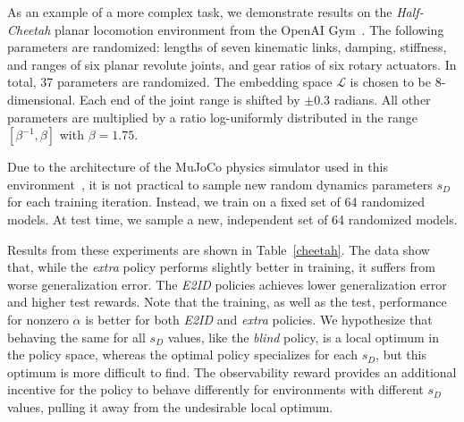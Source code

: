 \documentclass{article}
\newcommand{\cL}{\mathcal{L}}
\newcommand{\blind}{\emph{blind}}
\newcommand{\extra}{\emph{extra}}
\newcommand{\embed}{\emph{E2ID}}
\newcommand{\latent}{\cL}
\begin{document}
As an example of a more complex task, we demonstrate results on the \emph{Half-Cheetah}
planar locomotion environment from the OpenAI Gym~\citep{openai-gym}.
The following parameters are randomized:
lengths of seven kinematic links,
damping, stiffness, and ranges of six planar revolute joints,
and gear ratios of six rotary actuators.
In total, 37 parameters are randomized.
The embedding space $\latent$ is chosen to be 8-dimensional.
Each end of the joint range is shifted by $\pm 0.3$ radians.
All other parameters are multiplied by a ratio log-uniformly distributed in the range $[\beta^{-1}, \beta]$ with $\beta = 1.75$.

Due to the architecture of the MuJoCo physics simulator used in this environment~\citep{todorov-mujoco},
it is not practical to sample new random dynamics parameters $s_D$ for each training iteration.
Instead, we train on a fixed set of 64 randomized models.
At test time, we sample a new, independent set of 64 randomized models.

Results from these experiments are shown in Table~\ref{cheetah}.
The data show that, while the \extra{} policy performs slightly better in training,
it suffers from worse generalization error.
The \embed{} policies achieves lower generalization error and higher test rewards.
Note that the training, as well as the test, performance for nonzero $\alpha$
is better for both \embed{} and \extra{} policies.
We hypothesize that behaving the same for all $s_D$ values, like the \blind{} policy,
is a local optimum in the policy space,
whereas the optimal policy specializes for each $s_D$,
but this optimum is more difficult to find.
The observability reward provides an additional incentive
for the policy to behave differently for environments with different $s_D$ values,
pulling it away from the undesirable local optimum.
\end{document}
